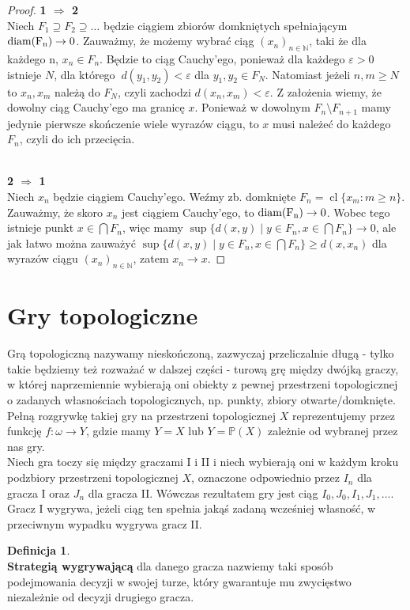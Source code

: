 \documentclass[12pt, a4paper, 2.5cm]{article}
\theoremstyle{definition}
\newtheorem{definition}{Definicja}
\begin{document}
	\begin{proof} 
		\textbf{1 $\Rightarrow$ 2} 
		\\ Niech $F_1 \supseteq F_2 \supseteq \ldots$ będzie ciągiem zbiorów domkniętych spełniającym $\rm diam(F_n) \to 0$. Zauważmy, że możemy wybrać ciąg $(x_n)_{n \in \mathbb{N}}$, taki że dla każdego n, $x_n \in F_n$. Będzie to ciąg Cauchy’ego, ponieważ dla każdego $\varepsilon>0$ istnieje $N$, dla którego $\ d(y_1, y_2)<\varepsilon $ dla $ y_1, y_2 \in F_N$. Natomiast jeżeli $n, m \ge N$ to $x_n, x_m$ należą do $F_N$, czyli zachodzi $d(x_n,x_m) < \varepsilon$. Z założenia wiemy, że dowolny ciąg Cauchy'ego ma granicę $x$. Ponieważ w dowolnym $F_n \setminus F_{n+1}$ mamy jedynie pierwsze skończenie wiele wyrazów ciągu, to $x$ musi należeć do każdego $F_n$, czyli do ich przecięcia. 
		
		~\\ 
		\textbf{2 $\Rightarrow$ 1} \\ Niech $x_n$ będzie ciągiem Cauchy'ego. Weźmy zb. domknięte $F_n = \operatorname{cl} \{x_m : m \ge n\}$. Zauważmy, że skoro $x_n$ jest ciągiem Cauchy'ego, to $\rm diam(F_n) \to 0$. Wobec tego istnieje punkt $x \in \bigcap F_n$, więc mamy $ \sup \{ d(x,y) \mid y \in F_n, x \in \bigcap F_n \} \to 0$, ale jak łatwo można zauważyć $ \sup \{ d(x, y) \mid y \in F_n, x \in \bigcap F_n \} \ge d(x,x_n)$ dla wyrazów ciągu $(x_n)_{n \in \mathbb{N}}$, zatem $x_n \to x$.
		
	\end{proof}
	
	\section{Gry topologiczne}
	Grą topologiczną nazywamy nieskończoną, zazwyczaj przeliczalnie długą - tylko takie będziemy też rozważać w dalszej części - turową grę między dwójką graczy, w której naprzemiennie wybierają oni obiekty z pewnej przestrzeni topologicznej o zadanych własnościach topologicznych, np. punkty, zbiory otwarte/domknięte. Pełną rozgrywkę takiej gry na przestrzeni topologicznej $X$ reprezentujemy przez funkcję $f:\omega\longrightarrow Y$, gdzie mamy $Y=X$ lub $Y=\mathbb{P}(X)$ zależnie od wybranej przez nas gry.\\
	Niech gra toczy się między graczami I i II i niech wybierają oni w każdym kroku podzbiory przestrzeni topologicznej $X$, oznaczone odpowiednio przez $I_n$ dla gracza I oraz $J_n$ dla gracza II. Wówczas rezultatem gry jest ciąg $I_0,J_0,I_1,J_1,\dots$. Gracz I wygrywa, jeżeli ciąg ten spełnia jakąś zadaną wcześniej własność, w przeciwnym wypadku wygrywa gracz II.
	\begin{definition}
		~\\
		\textbf{Strategią wygrywającą} dla danego gracza nazwiemy taki sposób podejmowania decyzji w swojej turze, który gwarantuje mu zwycięstwo niezależnie od decyzji drugiego gracza.
	\end{definition}
\end{document}

